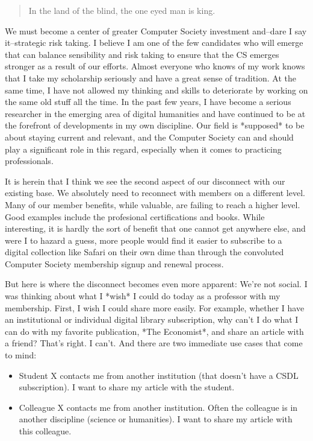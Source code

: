 \documentclass[11pt,english]{luclet}
\begin{document}
\begin{quote}
  In the land of the blind, the one eyed man is king.
\end{quote}

We must become a center of greater Computer Society investment and--dare I say
it--strategic risk taking. I believe I am one of the few candidates who will
emerge that can balance sensibility and risk taking to ensure that the CS
emerges stronger as a result of our efforts. Almost everyone who knows of my
work knows that I take my scholarship seriously and have a great sense of
tradition. At the same time, I have not allowed my thinking and skills to
deteriorate by working on the same old stuff all the time. In the past few
years, I have become a serious researcher in the emerging area of digital
humanities and have continued to be at the forefront of developments in my own
discipline. Our field is *supposed* to be about staying current and relevant,
and the Computer Society can and should play a significant role in this
regard, especially when it comes to practicing professionals.

It is herein that I think we see the second aspect of our disconnect with our
existing base. We absolutely need to reconnect with members on a different
level. Many of our member benefits, while valuable, are failing to reach a
higher level. Good examples include the profesional certifications and books.
While interesting, it is hardly the sort of benefit that one cannot get
anywhere else, and were I to hazard a guess, more people would find it easier
to subscribe to a digital collection like Safari on their own dime than
through the convoluted Computer Society membership signup and renewal process.

But here is where the disconnect becomes even more apparent: We're not social.
I was thinking about what I *wish* I could do today as a professor with my
membership. First, I wish I could share more easily. For example, whether I
have an institutional or individual digital library subscription, why can't I
do what I can do with my favorite publication, *The Economist*, and share an
article with a friend? That's right. I can't. And there are two immediate use
cases that come to mind:

\begin{itemize}
  
\item Student X contacts me from another institution (that doesn't have a CSDL
  subscription). I want to share my article with the student.

\item Colleague X contacts me from another institution. Often the colleague is in
  another discipline (science or humanities). I want to share my article with
  this colleague. 
\end{itemize}
\end{document}
